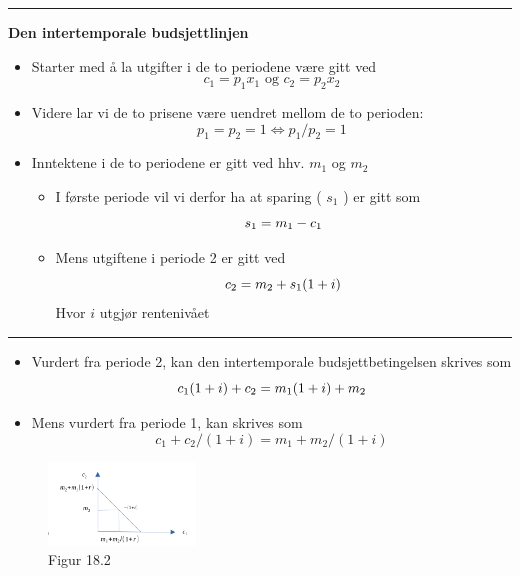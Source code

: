 \documentclass[
  letterpaper,
  DIV=11,
  numbers=noendperiod]{scrartcl}
\providecommand{\tightlist}{%
  \setlength{\itemsep}{0pt}\setlength{\parskip}{0pt}}\usepackage{longtable,booktabs,array}
\begin{document}
\begin{center}\rule{0.5\linewidth}{0.5pt}\end{center}

\textbf{Den intertemporale budsjettlinjen}

\begin{itemize}
\tightlist
\item
  Starter med å la utgifter i de to periodene være gitt ved \[
  c_1=p_1x_1 \text{ og } c_2=p_2x_2
  \]
\item
  Videre lar vi de to prisene være uendret mellom de to perioden: \[
  p_1=p_2=1 \Leftrightarrow  p_1/p_2 = 1
  \]
\item
  Inntektene i de to periodene er gitt ved hhv. \(m_1\) og \(m_2\)

  \begin{itemize}
  \tightlist
  \item
    I første periode vil vi derfor ha at sparing ( \(s_1\) ) er gitt som
    \[
    s_1 = m_1 -c_1 \\
    \]
  \item
    Mens utgiftene i periode 2 er gitt ved \[
    c_2 = m_2 + s_1(1+i) \\
    \] Hvor \(i\) utgjør rentenivået
  \end{itemize}
\end{itemize}

\begin{center}\rule{0.5\linewidth}{0.5pt}\end{center}

\begin{itemize}
\item
  Vurdert fra periode 2, kan den intertemporale budsjettbetingelsen
  skrives som \[
  c_1(1+i)+ c_2 = m_1(1+i)+ m_2  \\
  \]
\item
  Mens vurdert fra periode 1, kan skrives som \[
  c_1+ c_2/(1+i) = m_1+ m_2/(1+i)  
  \]
\end{itemize}

\begin{figure}[H]

{\centering \includegraphics[width=0.35\textwidth,height=\textheight]{drawio/int_budsj.png}

}

\caption{Figur 18.2}

\end{figure}%
\end{document}
